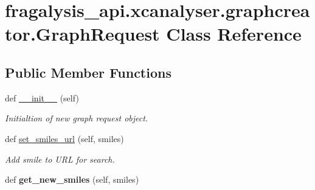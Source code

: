 \hypertarget{classfragalysis__api_1_1xcanalyser_1_1graphcreator_1_1_graph_request}{}\section{fragalysis\+\_\+api.\+xcanalyser.\+graphcreator.\+Graph\+Request Class Reference}
\label{classfragalysis__api_1_1xcanalyser_1_1graphcreator_1_1_graph_request}
\subsection*{Public Member Functions}
\begin{DoxyCompactItemize}
\item 
def \hyperlink{classfragalysis__api_1_1xcanalyser_1_1graphcreator_1_1_graph_request_ac2cce029ca7a29dab5625823e2eb92c2}{\+\_\+\+\_\+init\+\_\+\+\_\+} (self)
\begin{DoxyCompactList}\small\item\em Initialtion of new graph request object. \end{DoxyCompactList}\item 
def \hyperlink{classfragalysis__api_1_1xcanalyser_1_1graphcreator_1_1_graph_request_ac47f4baba7c0cdefd43bb0c7e17646c9}{set\+\_\+smiles\+\_\+url} (self, smiles)
\begin{DoxyCompactList}\small\item\em Add smile to U\+RL for search. \end{DoxyCompactList}\item 
\mbox{\label{classfragalysis__api_1_1xcanalyser_1_1graphcreator_1_1_graph_request_a1ca3ed55492a1722ef0feb76c7fba43f}} 
def {\bfseries get\+\_\+new\+\_\+smiles} (self, smiles)
\end{DoxyCompactItemize}
